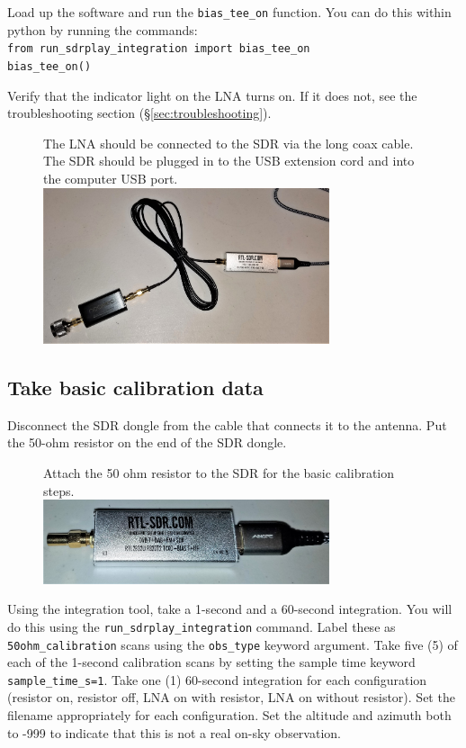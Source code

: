 \documentclass[11pt]{article}
\begin{document}
Load up the software and run the \texttt{bias\_tee\_on} function.
You can do this within python by running the commands:\\
\verb|from run_sdrplay_integration import bias_tee_on|\\
\verb|bias_tee_on()|


Verify that the indicator light on the LNA turns on.
If it does not, see the troubleshooting section (\S \ref{sec:troubleshooting}).

\begin{figure}[htp]
    \centering
    The LNA should be connected to the SDR via the long coax cable.  The SDR should be plugged in
    to the USB extension cord and into the computer USB port.\\
    \includegraphics[width=0.75\textwidth]{RadioLabPhotos/adapter_to_lna_to_cable_to_sdr.jpg}
\end{figure}

\subsection{Take basic calibration data}
Disconnect the SDR dongle from the cable that connects it to the antenna.
Put the 50-ohm resistor on the end of the SDR dongle.

\begin{figure}[htp]
    \centering
    Attach the 50 ohm resistor to the SDR for the basic calibration steps. \\
\includegraphics[width=0.75\textwidth]{RadioLabPhotos/sdr_with_resistor.jpg}
\end{figure}

Using the integration tool, take a 1-second and a 60-second integration.
You will do this using the \verb|run_sdrplay_integration| command.
Label these as \verb|50ohm_calibration| scans using the \verb|obs_type| keyword argument.
Take five (5) of each of the 1-second calibration scans by setting the sample time keyword \verb|sample_time_s=1|.  Take one (1) 60-second integration
for each configuration (resistor on, resistor off, LNA on with resistor, LNA on without resistor).
Set the filename appropriately for each configuration.
Set the altitude and azimuth both to -999 to indicate that this
is not a real on-sky observation.
\end{document}
